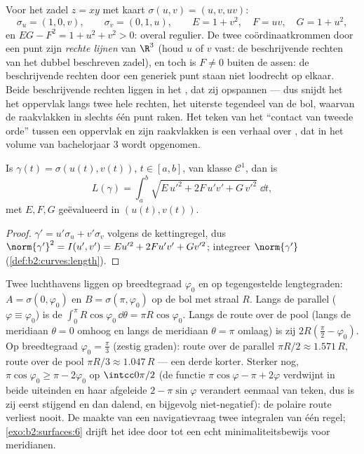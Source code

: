 \begin{example}[De zadelkaart]\label{ex:b2:surfaces:saddlechart}
Voor het zadel $z = xy$ met kaart $\sigma(u, v) = (u, v, uv)$:
\[
\sigma_u = (1, 0, v), \qquad \sigma_v = (0, 1, u),
\qquad
E = 1 + v^2, \quad F = uv, \quad G = 1 + u^2 ,
\]
en $EG - F^2 = 1 + u^2 + v^2 > 0$: overal regulier. De twee
coördinaatkrommen door een punt zijn \emph{rechte lijnen} van
$\R^3$ (houd $u$ of $v$ vast: de beschrijvende rechten van het
dubbel beschreven zadel), en toch is $F \neq 0$ buiten de assen: de
beschrijvende rechten door een generiek punt staan niet loodrecht
op elkaar. Beide beschrijvende rechten liggen in het , dat
zij opspannen --- dus snijdt het  het oppervlak langs twee
hele rechten, het uiterste tegendeel van de bol, waarvan de
raakvlakken in slechts één punt raken. Het teken van het
``contact van tweede orde'' tussen een oppervlak en zijn
raakvlakken is een verhaal over , dat in het volume van
bachelorjaar 3 wordt opgenomen.
\end{example}

\begin{proposition}\label{prop:b2:surfaces:curvelength}
Is $\gamma(t) = \sigma(u(t), v(t))$, $t \in [a, b]$, van klasse
$\mathcal{C}^1$, dan is
\[
L(\gamma) = \int_a^b
\sqrt{E\,u'^2 + 2F\,u'v' + G\,v'^2}\;\dd t ,
\]
met $E, F, G$ geëvalueerd in $(u(t), v(t))$.
\end{proposition}

\begin{proof}
$\gamma' = u'\sigma_u + v'\sigma_v$ volgens de kettingregel, dus
$\norm{\gamma'}^2 = I(u', v') = Eu'^2 + 2Fu'v' + Gv'^2$; integreer
$\norm{\gamma'}$ (\cref{def:b2:curves:length}).
\end{proof}

\begin{example}\label{ex:b2:surfaces:polarroute}
Twee luchthavens liggen op breedtegraad $\varphi_0$ en op
tegengestelde lengtegraden: $A = \sigma(0, \varphi_0)$ en $B =
\sigma(\pi, \varphi_0)$ op de bol met straal $R$. Langs de parallel
($\varphi \equiv \varphi_0$) is de  $\int_0^\pi
R\cos\varphi_0\,\dd\theta = \pi R\cos\varphi_0$. Langs de route
over de pool (langs de meridiaan $\theta = 0$ omhoog en langs de
meridiaan $\theta = \pi$ omlaag) is zij $2R(\frac\pi2 -
\varphi_0)$. Op breedtegraad $\varphi_0 = \frac\pi3$ (zestig
graden): route over de parallel $\pi R/2 \approx 1.571\,R$, route
over de pool $\pi R/3 \approx 1.047\,R$ --- een derde korter.
Sterker nog, $\pi\cos\varphi_0 \geq \pi - 2\varphi_0$ op
$\intcc0{\pi/2}$ (de functie $\pi\cos\varphi - \pi + 2\varphi$
verdwijnt in beide uiteinden en haar afgeleide $2 - \pi\sin\varphi$
verandert eenmaal van teken, dus is zij eerst stijgend en dan
dalend, en bijgevolg niet-negatief): de polaire route verliest
nooit. De  maakte van een navigatievraag
twee integralen van één regel; \cref{exo:b2:surfaces:6} drijft het
idee door tot een echt minimaliteitsbewijs voor meridianen.
\end{example}

